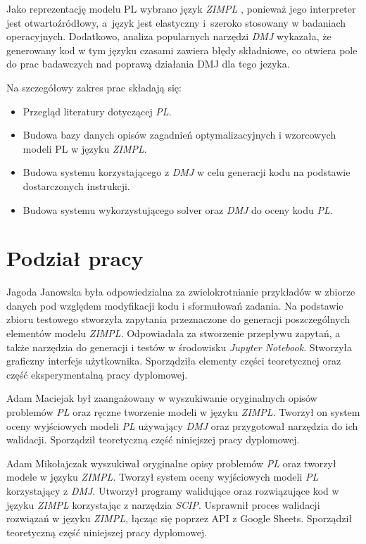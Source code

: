 Jako reprezentację modelu PL wybrano język \textit{ZIMPL} \cite{zimpl_manual}, ponieważ jego interpreter jest otwartoźródłowy, a~język jest elastyczny i~szeroko stosowany w badaniach operacyjnych. Dodatkowo, analiza popularnych narzędzi \textit{DMJ} wykazała, że generowany kod w tym języku czasami zawiera błędy składniowe, co otwiera pole do prac badawczych nad poprawą działania DMJ dla tego jezyka.

Na szczegółowy zakres prac składają się:
\begin{itemize}
    \item Przegląd literatury dotyczącej \textit{PL}.
    \item Budowa bazy danych opisów zagadnień optymalizacyjnych i wzorcowych modeli PL w języku \textit{ZIMPL}.
    \item Budowa systemu korzystającego z \textit{DMJ} w celu generacji kodu na podstawie dostarczonych instrukcji.
    \item Budowa systemu wykorzystującego solver oraz \textit{DMJ} do oceny kodu \textit{PL}.
\end{itemize}

\section{Podział pracy}

Jagoda Janowska była odpowiedzialna za zwielokrotnianie przykładów w zbiorze danych pod względem modyfikacji kodu i sformułowań zadania. Na podstawie zbioru testowego stworzyła zapytania przeznaczone do generacji poszczególnych elementów modelu \textit{ZIMPL}. Odpowiadała za stworzenie przepływu zapytań, a także narzędzia do generacji i testów w środowisku \textit{Jupyter Notebook}. Stworzyła graficzny interfejs użytkownika. Sporządziła elementy części teoretycznej oraz część eksperymentalną pracy dyplomowej.

Adam Maciejak był zaangażowany w wyszukiwanie oryginalnych opisów problemów \textit{PL} oraz ręczne tworzenie modeli w języku \textit{ZIMPL}. Tworzył on system oceny wyjściowych modeli \textit{PL} używający \textit{DMJ} oraz przygotował narzędzia do ich walidacji. Sporządził teoretyczną część niniejszej pracy dyplomowej.

Adam Mikołajczak wyszukiwał oryginalne opisy problemów \textit{PL} oraz tworzył modele w języku \textit{ZIMPL}. Tworzył system oceny wyjściowych modeli \textit{PL} korzystający z \textit{DMJ}. Utworzył programy walidujące oraz rozwiązujące kod w języku \textit{ZIMPL} korzystając z narzędzia \textit{SCIP}. Usprawnił proces walidacji rozwiązań w języku \textit{ZIMPL}, łącząc się poprzez API z Google Sheets. Sporządził teoretyczną część niniejszej pracy dyplomowej. 

